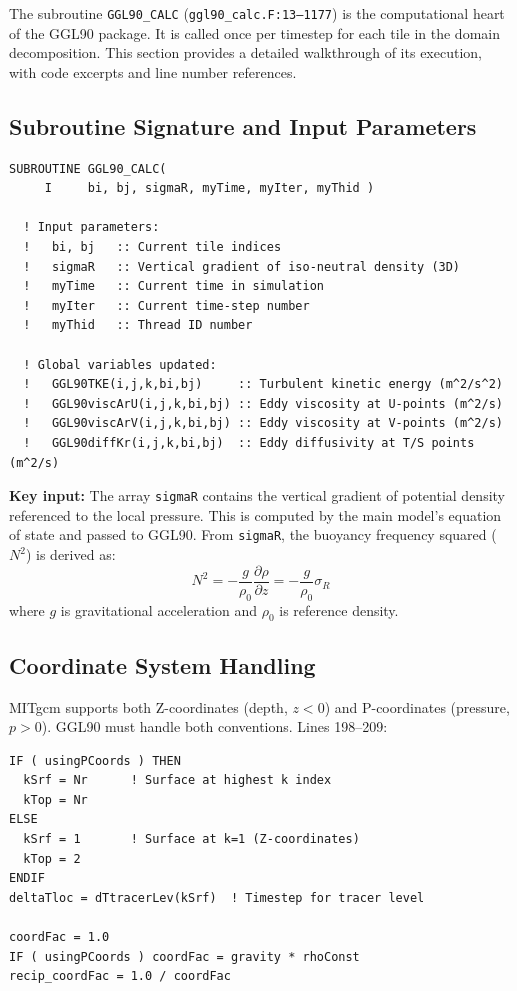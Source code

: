 \documentclass[12pt,letterpaper]{article}
\begin{document}
The subroutine \texttt{GGL90\_CALC} (\texttt{ggl90\_calc.F:13--1177}) is the
computational heart of the GGL90 package. It is called once per timestep for
each tile in the domain decomposition. This section provides a detailed
walkthrough of its execution, with code excerpts and line number references.

\subsection{Subroutine Signature and Input Parameters}

\begin{lstlisting}[caption={\texttt{ggl90\_calc.F}, lines 13--63 -- Subroutine interface.}]
SUBROUTINE GGL90_CALC(
     I     bi, bj, sigmaR, myTime, myIter, myThid )

  ! Input parameters:
  !   bi, bj   :: Current tile indices
  !   sigmaR   :: Vertical gradient of iso-neutral density (3D)
  !   myTime   :: Current time in simulation
  !   myIter   :: Current time-step number
  !   myThid   :: Thread ID number

  ! Global variables updated:
  !   GGL90TKE(i,j,k,bi,bj)     :: Turbulent kinetic energy (m^2/s^2)
  !   GGL90viscArU(i,j,k,bi,bj) :: Eddy viscosity at U-points (m^2/s)
  !   GGL90viscArV(i,j,k,bi,bj) :: Eddy viscosity at V-points (m^2/s)
  !   GGL90diffKr(i,j,k,bi,bj)  :: Eddy diffusivity at T/S points (m^2/s)
\end{lstlisting}

\textbf{Key input:} The array \texttt{sigmaR} contains the vertical gradient
of potential density referenced to the local pressure. This is computed by the
main model's equation of state and passed to GGL90. From \texttt{sigmaR}, the
buoyancy frequency squared ($N^2$) is derived as:
\[
N^2 = -\frac{g}{\rho_0} \frac{\partial \rho}{\partial z}
    = -\frac{g}{\rho_0} \sigma_R
\]
where $g$ is gravitational acceleration and $\rho_0$ is reference density.

\subsection{Coordinate System Handling}

MITgcm supports both Z-coordinates (depth, $z < 0$) and P-coordinates
(pressure, $p > 0$). GGL90 must handle both conventions. Lines 198--209:

\begin{lstlisting}[caption={\texttt{ggl90\_calc.F}, lines 198--209 -- Coordinate system setup.}]
IF ( usingPCoords ) THEN
  kSrf = Nr      ! Surface at highest k index
  kTop = Nr
ELSE
  kSrf = 1       ! Surface at k=1 (Z-coordinates)
  kTop = 2
ENDIF
deltaTloc = dTtracerLev(kSrf)  ! Timestep for tracer level

coordFac = 1.0
IF ( usingPCoords ) coordFac = gravity * rhoConst
recip_coordFac = 1.0 / coordFac
\end{lstlisting}
\end{document}
